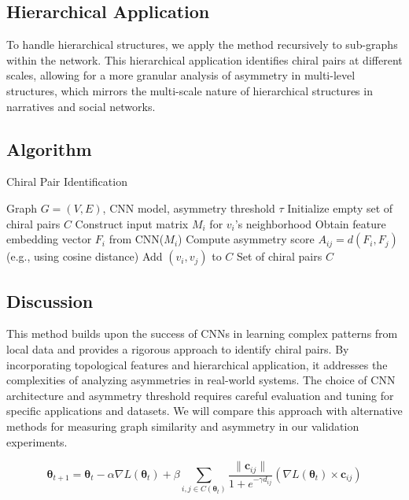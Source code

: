 \documentclass[12pt, a4paper]{article}
\begin{document}
\subsection{Hierarchical Application}

To handle hierarchical structures, we apply the method recursively to sub-graphs within the network. This hierarchical application identifies chiral pairs at different scales, allowing for a more granular analysis of asymmetry in multi-level structures, which mirrors the multi-scale nature of hierarchical structures in narratives and social networks.


\subsection{Algorithm}


\begin{algorithm}[H]
\caption{Chiral Pair Identification}
\begin{algorithmic}[1]
\Require Graph $G=(V,E)$, CNN model, asymmetry threshold $\tau$
\State Initialize empty set of chiral pairs $C$
    \State Construct input matrix $M_i$ for $v_i$'s neighborhood
    \State Obtain feature embedding vector $F_i$ from CNN($M_i$)
\EndFor
{}
    \State Compute asymmetry score $A_{ij} = d(F_i, F_j)$ (e.g., using cosine distance)
        \State Add $(v_i, v_j)$ to $C$
    \EndIf
\EndFor
\State \Return Set of chiral pairs $C$
\end{algorithmic}
\end{algorithm}


\subsection{Discussion}

This method builds upon the success of CNNs in learning complex patterns from local data and provides a rigorous approach to identify chiral pairs.  By incorporating topological features and hierarchical application, it addresses the complexities of analyzing asymmetries in real-world systems.  The choice of CNN architecture and asymmetry threshold requires careful evaluation and tuning for specific applications and datasets.  We will compare this approach with alternative methods for measuring graph similarity and asymmetry in our validation experiments.

\begin{equation} \label{eq:cgd_sigmoid_final}
\boldsymbol{\theta}_{t+1} = \boldsymbol{\theta}_t - \alpha \nabla L(\boldsymbol{\theta}_t) + \beta \sum_{i,j \in C(\boldsymbol{\theta}_t)}  \frac{\| \mathbf{c}_{ij} \|}{1 + e^{-\gamma d_{ij}}} (\nabla L(\boldsymbol{\theta}_t) \times \mathbf{c}_{ij})
\end{equation}
\end{document}
